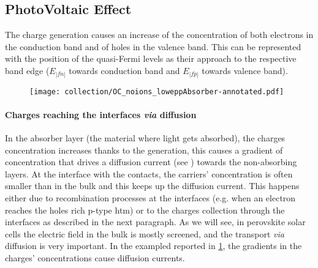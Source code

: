 	\subsection{PhotoVoltaic Effect}
	The charge generation causes an increase of the concentration of both electrons in the conduction band and of holes in the valence band.
	This can be represented with the position of the quasi\hyp{}Fermi levels as their approach to the respective band edge ($E_|fn|$ towards conduction band and $E_|fp|$ towards valence band).
	
	
	\begin{figure}
		\centering
		\texttt{[image: collection/OC\_noions\_loweppAbsorber-annotated.pdf]}
		\label{fig:collection}
	\end{figure}
	
		\paragraph{Charges reaching the interfaces \textsl{via} diffusion}
		In the absorber layer (the material where light gets absorbed), the charges concentration increases thanks to the generation, this causes a gradient of concentration that drives a diffusion current (see ) towards the non\hyp{}absorbing layers.
		At the interface with the contacts, the carriers' concentration is often smaller than in the bulk and this keeps up the diffusion current.
		This happens either due to recombination processes at the interfaces (e.g. when an electron reaches the holes rich p-type \gls{htm}) or to the charges collection through the interfaces as described in the next paragraph.
		As we will see, in perovskite solar cells the electric field in the bulk is mostly screened, and the transport \textsl{via} diffusion is very important.
		In the exampled reported in \cref{fig:collection}, the gradients in the charges' concentrations cause diffusion currents.
		

